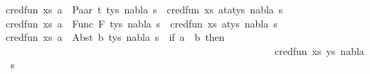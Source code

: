 \begin{isabellebody}
{\isachardoublequoteopen}cred{\isacharunderscore}{\kern0pt}fun\ {\isacharparenleft}{\kern0pt}{\isacharparenleft}{\kern0pt}xs{\isacharcomma}{\kern0pt}\ {\isacharparenleft}{\kern0pt}a\ {\isasymsharp}{\isacharquery}{\kern0pt}\ Paar\ t{}\ t{}{\isacharparenright}{\kern0pt}{\isacharhash}{\kern0pt}ys{\isacharparenright}{\kern0pt}{\isacharcomma}{\kern0pt}\ nabla{\isacharcomma}{\kern0pt}\ s{\isacharparenright}{\kern0pt}\ {\isacharequal}{\kern0pt}\ cred{\isacharunderscore}{\kern0pt}fun\ {\isacharparenleft}{\kern0pt}{\isacharparenleft}{\kern0pt}xs{\isacharcomma}{\kern0pt}\ {\isacharparenleft}{\kern0pt}a{\isasymsharp}{\isacharquery}{\kern0pt}t{}{\isacharparenright}{\kern0pt}{\isacharhash}{\kern0pt}{\isacharparenleft}{\kern0pt}a{\isasymsharp}{\isacharquery}{\kern0pt}t{}{\isacharparenright}{\kern0pt}{\isacharhash}{\kern0pt}ys{\isacharparenright}{\kern0pt}{\isacharcomma}{\kern0pt}\ nabla{\isacharcomma}{\kern0pt}\ s{\isacharparenright}{\kern0pt}{\isachardoublequoteclose}\ {\isacharbar}{\kern0pt}\isanewline
{\isachardoublequoteopen}cred{\isacharunderscore}{\kern0pt}fun\ {\isacharparenleft}{\kern0pt}{\isacharparenleft}{\kern0pt}xs{\isacharcomma}{\kern0pt}\ {\isacharparenleft}{\kern0pt}a\ {\isasymsharp}{\isacharquery}{\kern0pt}\ Func\ F\ t{\isacharparenright}{\kern0pt}{\isacharhash}{\kern0pt}ys{\isacharparenright}{\kern0pt}{\isacharcomma}{\kern0pt}\ nabla{\isacharcomma}{\kern0pt}\ s{\isacharparenright}{\kern0pt}\ {\isacharequal}{\kern0pt}\ cred{\isacharunderscore}{\kern0pt}fun\ {\isacharparenleft}{\kern0pt}{\isacharparenleft}{\kern0pt}xs{\isacharcomma}{\kern0pt}\ {\isacharparenleft}{\kern0pt}a{\isasymsharp}{\isacharquery}{\kern0pt}t{\isacharparenright}{\kern0pt}{\isacharhash}{\kern0pt}ys{\isacharparenright}{\kern0pt}{\isacharcomma}{\kern0pt}\ nabla{\isacharcomma}{\kern0pt}\ s{\isacharparenright}{\kern0pt}{\isachardoublequoteclose}\ {\isacharbar}{\kern0pt}\isanewline
{\isachardoublequoteopen}cred{\isacharunderscore}{\kern0pt}fun\ {\isacharparenleft}{\kern0pt}{\isacharparenleft}{\kern0pt}xs{\isacharcomma}{\kern0pt}\ {\isacharparenleft}{\kern0pt}a\ {\isasymsharp}{\isacharquery}{\kern0pt}\ Abst\ b\ t{\isacharparenright}{\kern0pt}{\isacharhash}{\kern0pt}ys{\isacharparenright}{\kern0pt}{\isacharcomma}{\kern0pt}\ nabla{\isacharcomma}{\kern0pt}\ s{\isacharparenright}{\kern0pt}\ {\isacharequal}{\kern0pt}\ {\isacharparenleft}{\kern0pt}if\ a\ {\isacharequal}{\kern0pt}\ b\ then\isanewline
\ \ \ \ \ \ \ \ \ \ \ \ \ \ \ \ \ \ \ \ \ \ \ \ \ \ \ \ \ \ \ \ \ \ \ \ \ \ \ \ \ \ \ \ \ \ \ \ \ \ \ \ \ \ cred{\isacharunderscore}{\kern0pt}fun\ {\isacharparenleft}{\kern0pt}{\isacharparenleft}{\kern0pt}xs{\isacharcomma}{\kern0pt}\ ys{\isacharparenright}{\kern0pt}{\isacharcomma}{\kern0pt}\ nabla{\isacharcomma}{\kern0pt}\ s{\isacharparenright}{\kern0pt}\isanewline

\end{isabellebody}
